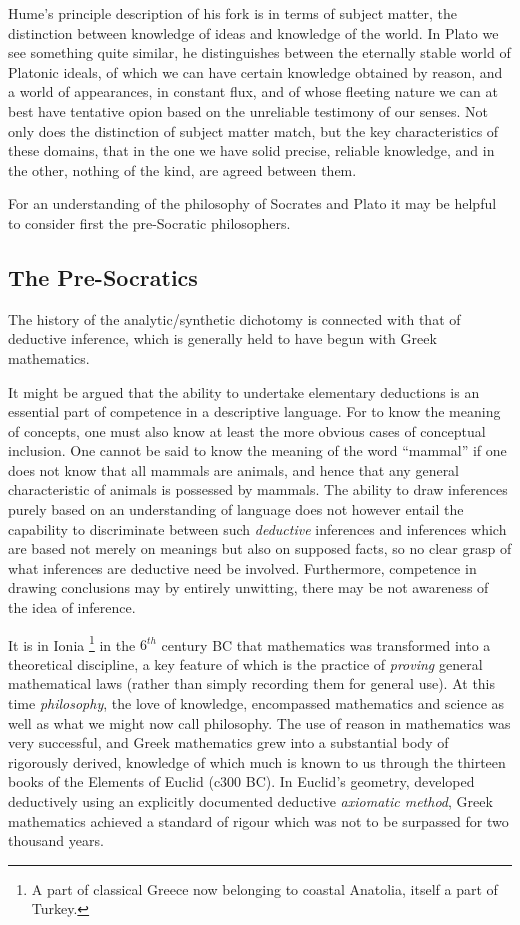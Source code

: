 Hume's principle description of his fork is in terms of subject
matter, the distinction between knowledge of ideas and knowledge of
the world. 
In Plato we see something quite similar, he distinguishes between the
eternally stable world of Platonic ideals, of which we can have
certain knowledge obtained by reason, and a world of appearances, in
constant flux, and of whose fleeting nature we can at best have
tentative opion based on the unreliable testimony of our senses.
Not only does the distinction of subject matter match, but the key
characteristics of these domains, that in the one we have solid
precise, reliable knowledge, and in the other, nothing of the kind,
are agreed between them.

For an understanding of the
philosophy of Socrates and Plato it may be helpful to consider first
the pre-Socratic philosophers.

\subsection{The Pre-Socratics}

The history of the analytic/\-synthetic dichotomy is connected with that
of deductive inference, which is generally held to have begun with
Greek mathematics.

It might be argued that the ability to undertake elementary
deductions is an essential part of competence in a descriptive
language.
For to know the meaning of concepts, one must also know at least the
more obvious cases of conceptual inclusion.
One cannot be said to know the meaning of the word ``mammal'' if one
does not know that all mammals are animals, and hence that any general
characteristic of animals is possessed by mammals.
The ability to draw inferences purely based on an understanding of
language does not however entail the capability to discriminate
between such \emph{deductive} inferences and inferences which are
based not merely on meanings but also on supposed facts, so no clear
grasp of what inferences are deductive need be involved.
Furthermore, competence in drawing conclusions may by entirely
unwitting, there may be not awareness of the idea of inference.

It is in Ionia%
\footnote{A part of classical Greece now belonging to coastal Anatolia,
  itself a part of Turkey.}%
 in the $6^{th}$ century BC that mathematics was transformed into a
 theoretical discipline, a key feature of which is the practice of
 \emph{proving} general mathematical laws (rather than simply
 recording them for general use).
At this time \emph{philosophy}, the love of knowledge, encompassed
mathematics and science as well as what we might now call philosophy.
The use of reason in mathematics was very successful, and Greek
mathematics grew into a substantial body of rigorously derived,
knowledge of which much is known to us through the thirteen books of
the Elements of Euclid (c300 BC). 
In Euclid's geometry, developed deductively using an explicitly
documented deductive \emph{axiomatic method},
Greek mathematics achieved a standard of rigour which was not to be
surpassed for two thousand years.

